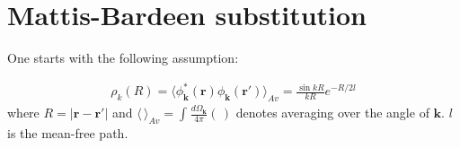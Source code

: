 \documentclass[aps,prb,reprint,noeprint,superscriptaddress]{revtex4-1}
\begin{document}





\newpage
\appendix
\section{Mattis-Bardeen substitution}
\label{apdx:MB}

One starts with the following assumption:

\begin{eqnarray*}
	\rho_k(R) = \langle \phi_\mathbf{k}^*(\mathbf{r})
	\phi_\mathbf{k}(\mathbf{r}') \rangle_{Av}
	=
	\frac{\sin k R}{k R} e^{-R/2l}
\end{eqnarray*}
where $R=\left|\mathbf{r}-\mathbf{r}'\right|$ and $\langle \, \rangle_{Av} =
\int_{}^{}\frac{d\Omega_\mathbf{k}}{4\pi}(\,)$ denotes
averaging over the angle of $\mathbf{k}$. $l$ is the mean-free path.
\end{document}
